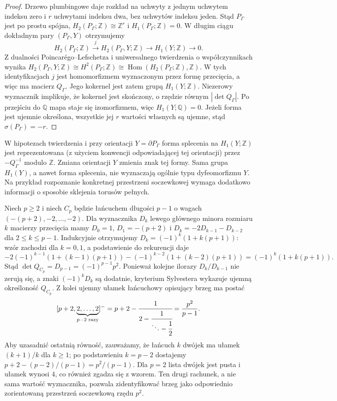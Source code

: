 \begin{proof}
Drzewo plumbingowe daje rozkład na uchwyty z jednym uchwytem indeksu
zero i $r$ uchwytami indeksu dwa, bez uchwytów indeksu jeden.
Stąd $P_\Gamma$ jest po prostu spójna,
$H_2(P_\Gamma;\mathbb Z)\cong\mathbb Z^r$ i
$H_1(P_\Gamma;\mathbb Z)=0$. W długim ciągu dokładnym pary
$(P_\Gamma,Y)$ otrzymujemy
\[
 H_2(P_\Gamma;\mathbb Z)\xrightarrow{j}
 H_2(P_\Gamma,Y;\mathbb Z)\longrightarrow
 H_1(Y;\mathbb Z)\longrightarrow0.
\]
Z dualności Poincar\'ego--Lefschetza i uniwersalnego twierdzenia
o współczynnikach wynika
$H_2(P_\Gamma,Y;\mathbb Z)\cong H^2(P_\Gamma;\mathbb Z)
\cong\operatorname{Hom}(H_2(P_\Gamma;\mathbb Z),\mathbb Z)$.
W tych identyfikacjach $j$ jest homomorfizmem wyznaczonym przez
formę przecięcia, a więc ma macierz $Q_\Gamma$. Jego kokernel
jest zatem grupą $H_1(Y;\mathbb Z)$. Niezerowy wyznacznik
implikuje, że kokernel jest skończony, o rzędzie równym
$|\det Q_\Gamma|$. Po przejściu do $\mathbb Q$ mapa staje się
izomorfizmem, więc $H_1(Y;\mathbb Q)=0$.
Jeżeli forma jest ujemnie określona, wszystkie jej $r$
wartości własnych są ujemne, stąd $\sigma(P_\Gamma)=-r$.
\end{proof}

\begin{uwaga}
W hipotezach twierdzenia i przy orientacji $Y=\partial P_\Gamma$
forma splecenia na $H_1(Y;\mathbb Z)$ jest reprezentowana
(z użyciem konwencji odpowiadającej tej orientacji) przez
$-Q_\Gamma^{-1}$ modulo $\mathbb Z$. Zmiana orientacji $Y$
zmienia znak tej formy. Sama grupa $H_1(Y)$, a nawet
forma splecenia, nie wyznaczają ogólnie typu dyfeomorfizmu $Y$.
Na przykład rozpoznanie konkretnej przestrzeni soczewkowej
wymaga dodatkowo informacji o sposobie sklejenia torusów pełnych.
\end{uwaga}

\begin{przyklad}
\label{ex:tg-syn-cp}
Niech $p\ge2$ i niech $C_p$ będzie łańcuchem długości $p-1$
o wagach $(-(p+2),-2,\ldots,-2)$. Dla wyznacznika
$D_k$ lewego głównego minora rozmiaru $k$ macierzy przecięcia
mamy $D_0=1$, $D_1=-(p+2)$ i
$D_k=-2D_{k-1}-D_{k-2}$ dla $2\le k\le p-1$.
Indukcyjnie otrzymujemy
$D_k=(-1)^k(1+k(p+1))$: wzór zachodzi dla $k=0,1$,
a podstawienie do rekurencji daje
\[
 -2(-1)^{k-1}(1+(k-1)(p+1))
 -(-1)^{k-2}(1+(k-2)(p+1))
 =(-1)^k(1+k(p+1)).
\]
Stąd $\det Q_{C_p}=D_{p-1}=(-1)^{p-1}p^2$.
Ponieważ kolejne ilorazy $D_k/D_{k-1}$ nie zerują się,
a znaki $(-1)^kD_k$ są dodatnie, kryterium Sylvestera
wykazuje ujemną określoność $Q_{C_p}$.
Z kolei ujemny ułamek łańcuchowy opisujący brzeg ma postać
\[
[p+2,\underbrace{2,\ldots,2}_{p-2\text{ razy}}]^-
=p+2-\cfrac{1}{2-\cfrac{1}{\ddots-\cfrac12}}
=\frac{p^2}{p-1}.
\]
Aby uzasadnić ostatnią równość, zauważamy, że łańcuch
$k$ dwójek ma ułamek $(k+1)/k$ dla $k\ge1$;
po podstawieniu $k=p-2$ dostajemy
$p+2-(p-2)/(p-1)=p^2/(p-1)$.
Dla $p=2$ lista dwójek jest pusta i ułamek wynosi $4$,
co również zgadza się z wzorem.
Ten drugi rachunek, a nie sama wartość wyznacznika,
pozwala zidentyfikować brzeg jako odpowiednio zorientowaną
przestrzeń soczewkową rzędu $p^2$.
\end{przyklad}


